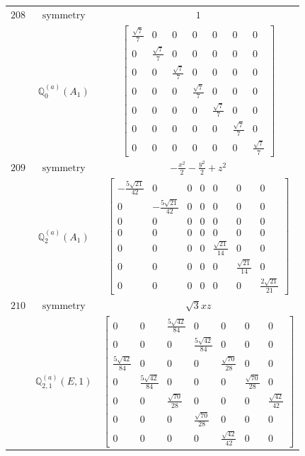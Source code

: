 \documentclass[fleqn,8pt,landscape]{jsarticle}
\begin{document}
\begin{longtable}{ccc}
$ 208 $ & $ \text{symmetry} $ & $ 1 $ \\
$  $ & $ \mathbb{Q}_{0}^{(a)}(A_{1}) $ & $ \begin{bmatrix} \frac{\sqrt{7}}{7} & 0 & 0 & 0 & 0 & 0 & 0 \\ 0 & \frac{\sqrt{7}}{7} & 0 & 0 & 0 & 0 & 0 \\ 0 & 0 & \frac{\sqrt{7}}{7} & 0 & 0 & 0 & 0 \\ 0 & 0 & 0 & \frac{\sqrt{7}}{7} & 0 & 0 & 0 \\ 0 & 0 & 0 & 0 & \frac{\sqrt{7}}{7} & 0 & 0 \\ 0 & 0 & 0 & 0 & 0 & \frac{\sqrt{7}}{7} & 0 \\ 0 & 0 & 0 & 0 & 0 & 0 & \frac{\sqrt{7}}{7} \end{bmatrix} $ \\ \hline
$ 209 $ & $ \text{symmetry} $ & $ - \frac{x^{2}}{2} - \frac{y^{2}}{2} + z^{2} $ \\
$  $ & $ \mathbb{Q}_{2}^{(a)}(A_{1}) $ & $ \begin{bmatrix} - \frac{5 \sqrt{21}}{42} & 0 & 0 & 0 & 0 & 0 & 0 \\ 0 & - \frac{5 \sqrt{21}}{42} & 0 & 0 & 0 & 0 & 0 \\ 0 & 0 & 0 & 0 & 0 & 0 & 0 \\ 0 & 0 & 0 & 0 & 0 & 0 & 0 \\ 0 & 0 & 0 & 0 & \frac{\sqrt{21}}{14} & 0 & 0 \\ 0 & 0 & 0 & 0 & 0 & \frac{\sqrt{21}}{14} & 0 \\ 0 & 0 & 0 & 0 & 0 & 0 & \frac{2 \sqrt{21}}{21} \end{bmatrix} $ \\ \hline
$ 210 $ & $ \text{symmetry} $ & $ \sqrt{3} x z $ \\
$  $ & $ \mathbb{Q}_{2,1}^{(a)}(E,1) $ & $ \begin{bmatrix} 0 & 0 & \frac{5 \sqrt{42}}{84} & 0 & 0 & 0 & 0 \\ 0 & 0 & 0 & \frac{5 \sqrt{42}}{84} & 0 & 0 & 0 \\ \frac{5 \sqrt{42}}{84} & 0 & 0 & 0 & \frac{\sqrt{70}}{28} & 0 & 0 \\ 0 & \frac{5 \sqrt{42}}{84} & 0 & 0 & 0 & \frac{\sqrt{70}}{28} & 0 \\ 0 & 0 & \frac{\sqrt{70}}{28} & 0 & 0 & 0 & \frac{\sqrt{42}}{42} \\ 0 & 0 & 0 & \frac{\sqrt{70}}{28} & 0 & 0 & 0 \\ 0 & 0 & 0 & 0 & \frac{\sqrt{42}}{42} & 0 & 0 \end{bmatrix} $ \\ \hline

\end{longtable}
\end{document}
